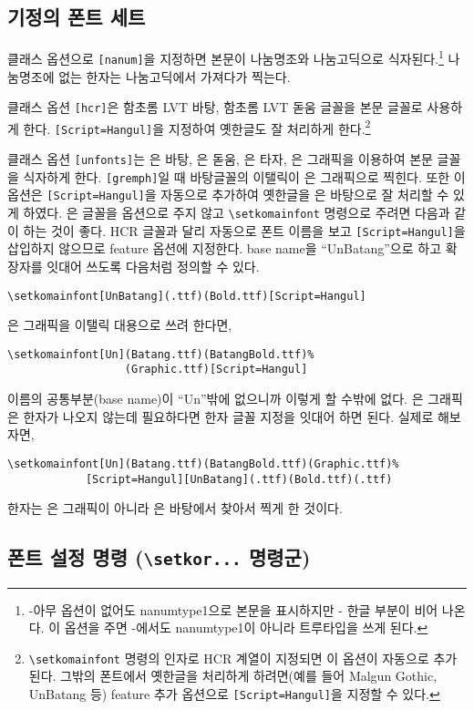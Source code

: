 \documentclass[
	12pt,
	a4paper,
	kosection,
	footnote,
	nobookmarks,
	microtype,
]{oblivoir}
\def\cs#1{\texttt{\textbackslash #1}}
\begin{document}
\subsection{기정의 폰트 세트}

클래스 옵션으로 \texttt{[nanum]}을 지정하면 본문이 나눔명조와 나눔고딕으로 식자된다.\footnote{%
	\LuaTeX- 아무 옵션이 없어도 nanumtype1으로 본문을 표시하지만 \XeTeX-
	한글 부분이 비어 나온다. 이 옵션을 주면 \LuaTeX-\ko 에서도 nanumtype1이 아니라 트루타입을 쓰게 된다.}
나눔명조에 없는 한자는 나눔고딕에서 가져다가 찍는다.

클래스 옵션 \texttt{[hcr]}은 함초롬 LVT 바탕, 함초롬 LVT 돋움 글꼴을 본문 글꼴로 사용하게 한다.
\texttt{[Script=Hangul]}을 지정하여 옛한글도 잘 처리하게 한다.\footnote{%
	\cs{setkomainfont} 명령의 인자로 HCR 계열이 지정되면 이 옵션이 자동으로 추가된다.
	그밖의 폰트에서 옛한글을 처리하게 하려면(예를 들어 Malgun Gothic, UnBatang 등)
	feature 추가 옵션으로 \texttt{[Script=Hangul]}을 지정할 수 있다.}

클래스 옵션 \texttt{[unfonts]}는 은 바탕, 은 돋움, 은 타자, 은 그래픽을 이용하여 본문 글꼴을 식자하게 한다.
\texttt{[gremph]}일 때 바탕글꼴의 이탤릭이 은 그래픽으로 찍힌다. 또한 이 옵션은 \texttt{[Script=Hangul]}을
자동으로 추가하여 옛한글을 은 바탕으로 잘 처리할 수 있게 하였다. 은 글꼴을 옵션으로 주지 않고 \cs{setkomainfont} 명령으로 주려면 다음과 같이 하는 것이 좋다. HCR 글꼴과 달리 자동으로 폰트 이름을 보고 \texttt{[Script=Hangul]}을 삽입하지 않으므로 feature 옵션에 지정한다. base name을 ``UnBatang''으로 하고 확장자를 잇대어 쓰도록 
다음처럼 정의할 수 있다.
\begin{verbatim}
\setkomainfont[UnBatang](.ttf)(Bold.ttf)[Script=Hangul]
\end{verbatim}
은 그래픽을 이탤릭 대용으로 쓰려 한다면,
\begin{verbatim}
\setkomainfont[Un](Batang.ttf)(BatangBold.ttf)%
                  (Graphic.ttf)[Script=Hangul]
\end{verbatim}
이름의 공통부분(base name)이 ``Un''밖에 없으니까 이렇게 할 수밖에 없다. 은 그래픽은 한자가 나오지 않는데
필요하다면 한자 글꼴 지정을 잇대어 하면 된다. 실제로 해보자면,
\begin{verbatim}
\setkomainfont[Un](Batang.ttf)(BatangBold.ttf)(Graphic.ttf)%
            [Script=Hangul][UnBatang](.ttf)(Bold.ttf)(.ttf)
\end{verbatim}
한자는 은 그래픽이 아니라 은 바탕에서 찾아서 찍게 한 것이다.

\subsection{폰트 설정 명령 (\protect\cs{setkor...} 명령군)}
\end{document}
